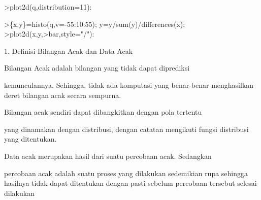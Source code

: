 \documentclass[a4paper,10pt]{article}
\begin{document}
\begin{eulernotebook}
\begin{eulercomment}
\begin{eulercomment}
\begin{eulercomment}
\begin{eulercomment}
\begin{eulercomment}
\begin{eulercomment}
\begin{eulercomment}
\begin{eulercomment}
\begin{eulercomment}
\begin{eulercomment}
\begin{euleroutput}
  [613,  814,  1088,  1404,  1904,  2389,  1431,  1109,  841,  680]
\end{euleroutput}
\begin{eulerprompt}
>plot2d(q,distribution=11):
\end{eulerprompt}
\begin{eulerprompt}
>\{x,y\}=histo(q,v=-55:10:55); y=y/sum(y)/differences(x);
>plot2d(x,y,>bar,style="/"):
\end{eulerprompt}
\begin{eulercomment}
\end{eulercomment}
\begin{eulercomment}
1. Definisi Bilangan Acak dan Data Acak

\end{eulercomment}
\begin{eulerttcomment}
      Bilangan Acak adalah bilangan yang tidak dapat diprediksi
\end{eulerttcomment}
\begin{eulercomment}
kemunculannya. Sehingga, tidak ada komputasi yang benar-benar
menghasilkan deret bilangan acak secara sempurna.\\
\end{eulercomment}
\begin{eulerttcomment}
      Bilangan acak sendiri dapat dibangkitkan dengan pola tertentu
\end{eulerttcomment}
\begin{eulercomment}
yang dinamakan dengan distribusi, dengan catatan mengikuti fungsi
distribusi yang ditentukan.\\
\end{eulercomment}
\begin{eulerttcomment}
      Data acak merupakan hasil dari suatu percobaan acak. Sedangkan
\end{eulerttcomment}
\begin{eulercomment}
percobaan acak adalah suatu proses yang dilakukan sedemikian rupa
sehingga hasilnya tidak dapat ditentukan dengan pasti sebelum
percobaan tersebut selesai dilakukan


\end{eulercomment}
\end{eulercomment}
\end{eulercomment}
\end{eulercomment}
\end{eulercomment}
\end{eulercomment}
\end{eulercomment}
\end{eulercomment}
\end{eulercomment}
\end{eulercomment}
\end{eulercomment}
\end{eulernotebook}
\end{document}
